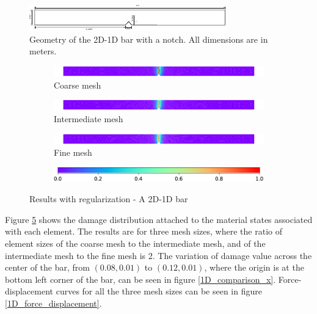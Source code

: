 \documentclass[12pt]{elsarticle}
\begin{document}
\begin{figure}
	\centering
	\includegraphics[width=\linewidth]{./Images/2d_1d_bar/2d_1d_bar.pdf}
	\caption{Geometry of the 2D-1D bar with a notch. All dimensions are in meters.}
	\label{2d_1d_bar_dims}
\end{figure}


\begin{figure}[ht]
	\begin{subfigure}{\textwidth}
		\centering
		\includegraphics[width=\linewidth]{./Images/2d_1d_bar/damage_coarse.pdf}
		\caption{Coarse mesh}
		\label{2d_1d_bar_damage_coarse}
	\end{subfigure}
	\begin{subfigure}{\textwidth}
		\centering
		\includegraphics[width=\linewidth]{./Images/2d_1d_bar/damage_inter.pdf}
		\caption{Intermediate mesh}
		\label{2d_1d_bar_damage_inter}
	\end{subfigure}
	\begin{subfigure}{\textwidth}
		\centering
		\includegraphics[width=\linewidth]{./Images/2d_1d_bar/damage_fine.pdf}
		\caption{Fine mesh}
		\label{2d_1d_bar_damage_fine}
	\end{subfigure}
	\begin{subfigure}{\textwidth}
		\centering
		\vfill
		\includegraphics[width=0.4\linewidth]{./Images/2d_1d_bar/cb.pdf}
	\end{subfigure}
	\caption{Results with regularization - A 2D-1D bar}
	\label{2d_1d_bar_damage}
\end{figure}

Figure \ref{2d_1d_bar_damage} shows the damage distribution attached to the material states associated with each element. The results are for three mesh sizes, where the ratio of element sizes of the coarse mesh to the intermediate mesh, and of the intermediate mesh to the fine mesh is 2. The variation of damage value across the center of the bar, from $(0.08,0.01)$ to $(0.12,0.01)$, where the origin is at the bottom left corner of the bar, can be seen in figure \ref{1D_comparison_x}. Force-displacement curves for all the three mesh sizes can be seen in figure \ref{1D_force_displacement}. 
\end{document}

